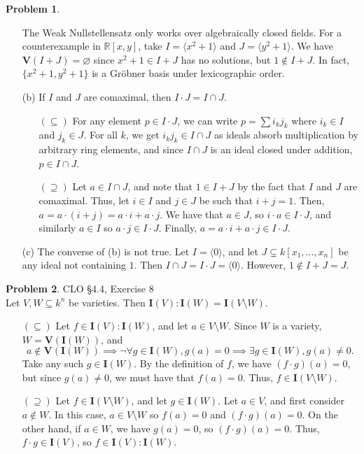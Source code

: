 \documentclass[12pt]{amsart}
\theoremstyle{definition}
\newtheorem{prob}{Problem}
\begin{document}
\begin{flushleft}
\begin{prob}
\begin{enumerate}
    The Weak Nullstellensatz only works over algebraically closed fields. For a counterexample in $\mathbb R[x,y]$, take $I = \langle x^2+1\rangle$ and $J = \langle y^2+1\rangle$. We have $\mathbf V(I+J) = \varnothing$ since $x^2 +1 \in I+J$ has no solutions, but $1 \not \in I+J$. In fact, $\{ x^2+1,y^2+1\}$ is a Gr\"obner basis under lexicographic order.
    \item[(b)] If $I$ and $J$ are comaximal, then $I \cdot J = I \cap J$.
    \begin{enumerate} 
    \item[$(\subseteq)$] For any element $p \in I\cdot J$, we can write $p = \sum i_k j_k$ where $i_k \in I$ and $j_k \in J$. For all $k$, we get $i_k j_k \in I \cap J$ as ideals absorb multiplication by arbitrary ring elements, and since $I \cap J$ is an ideal closed under addition, $p \in I \cap J$.\item[$(\supseteq)$] Let $a \in I \cap J$, and note that $1\in I + J$ by the fact that $I$ and $J$ are comaximal. Thus, let $i\in I$ and $j \in J$ be such that $i + j = 1$. Then, $a=a\cdot(i+j) = a\cdot i + a\cdot j$. We have that $a \in J$, so $i \cdot a \in I\cdot J$, and similarly $a \in I$ so $a\cdot j \in I \cdot J$. Finally, $a = a\cdot i + a\cdot j \in I \cdot J$.
    \end{enumerate}
    \item[(c)] The converse of (b) is not true. Let $I = \langle 0 \rangle$, and let $J \subsetneq k[x_1,\dots,x_n]$ be any ideal not containing $1$. Then $I \cap J = I\cdot J =\langle 0 \rangle$. However, $1\not\in I+J= J$.
\end{enumerate}
\end{prob}

\bigskip 


\begin{prob}  CLO \S4.4, Exercise 8 \smallskip \\
Let $V,W\subseteq k^n$ be varieties. Then $\mathbf I(V):\mathbf I(W) = \mathbf I(V\setminus W)$. 

\begin{enumerate}
    \item[$(\subseteq)$] Let $f \in \mathbf I(V) : \mathbf I(W)$, and let $a \in V \setminus W$. Since $W$ is a variety, $W=\mathbf V(\mathbf I (W))$, and \[a \not \in \mathbf V(\mathbf I (W))  \implies \lnot \forall g \in \mathbf I(W), g(a)=0 \implies \exists g \in \mathbf I(W), g(a)\neq 0.\] Take any such $g \in \mathbf I(W)$. By the definition of $f$, we have $(f\cdot g)(a) = 0$, but since $g(a)\neq 0$, we must have that $f(a)=0$. Thus, $f \in \mathbf I(V\setminus W)$.
    \item[$(\supseteq)$] Let $f \in \mathbf I(V \setminus W)$, and let $g \in \mathbf I(W)$. Let $a \in V$, and first consider $a \not \in W$. In this case, $a \in V \setminus W$ so $f(a) = 0$ and $(f\cdot g)(a)=0$. On the other hand, if $a \in W$, we have $g(a) = 0$, so $(f\cdot g)(a) = 0$. Thus, $f\cdot g \in \mathbf I(V)$, so $f \in \mathbf I(V):\mathbf I(W)$.
\end{enumerate}


\end{prob}
\end{flushleft}
\end{document}
